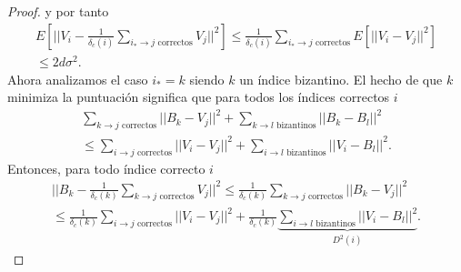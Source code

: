 \begin{proof}
	y por tanto
	\begin{equation}\begin{split}
			E[||V_i - \frac{1}{\delta_c(i)}\sum_{i_* \to j \text{ correctos}}V_j||^2] \le \frac{1}{\delta_c(i)}\sum_{i_* \to j \text{ correctos}}E[||V_i - V_j||^2] \\
			\le 2d \sigma^2.
	\end{split}\end{equation}
	Ahora analizamos el caso $i_*=k$ siendo $k$ un índice bizantino. El hecho de que $k$ minimiza la puntuación significa que para todos los índices correctos $i$
	\begin{equation}\begin{split}
			\sum_{k \to j \text{ correctos}} ||B_k - V_j||^2 + \sum_{k \to l \text{ bizantinos}} ||B_k - B_l||^2 \\
			\le \sum_{i \to j \text{ correctos}} ||V_i - V_j||^2 + \sum_{i \to l \text{ bizantinos}} ||V_i - B_l||^2.
	\end{split}\end{equation}
	Entonces, para todo índice correcto $i$
	\begin{equation}\begin{split}
			||B_k - \frac{1}{\delta_c(k)} \sum_{k \to j \text{ correctos}}V_j||^2 \le \frac{1}{\delta_c(k)}\sum_{k \to j \text{ correctos}} ||B_k - V_j||^2 \\
			\le \frac{1}{\delta_c(k)}\sum_{i \to j \text{ correctos}} ||V_i - V_j||^2 + \frac{1}{\delta_c(k)} \underbrace{\sum_{i \to l \text{ bizantinos}} ||V_i - B_l||^2}_{D^2(i)}.
	\end{split}\end{equation}
	

\end{proof}
